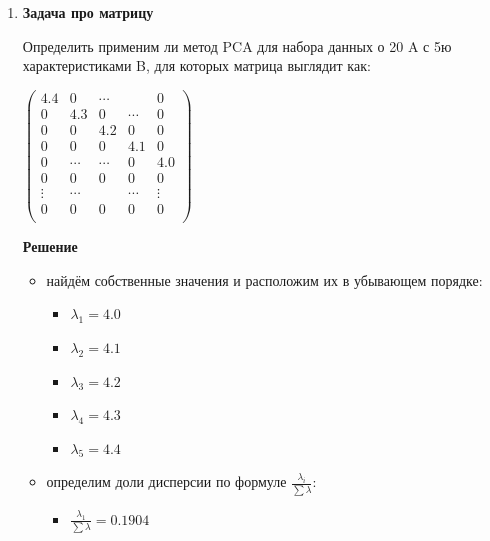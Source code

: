 \begin{enumerate}
    \item \textbf{Задача про матрицу} \par
          Определить применим ли метод PCA для набора данных о 20 A  с 5ю характеристиками B, для которых матрица выглядит как:\par
          $\begin{pmatrix}
                  4.4    & 0      & \cdots &        & 0      \\
                  0      & 4.3    & 0      & \cdots & 0      \\
                  0      & 0      & 4.2    & 0      & 0      \\
                  0      & 0      & 0      & 4.1    & 0      \\
                  0      & \cdots & \cdots & 0      & 4.0    \\
                  0      & 0      & 0      & 0      & 0      \\
                  \vdots & \cdots &        & \cdots & \vdots \\
                  0      & 0      & 0      & 0      & 0      \\
              \end{pmatrix}$ \par
          \textbf{Решение} \par
          \begin{itemize}
              \item найдём собственные значения и расположим их в убывающем порядке:\par
                    \begin{itemize}
                        \item $\lambda_{1}  = 4.0$
                        \item $\lambda_{2}  = 4.1$
                        \item $\lambda_{3}  = 4.2$
                        \item $\lambda_{4}  = 4.3$
                        \item $\lambda_{5}  = 4.4$
                    \end{itemize}
              \item определим доли дисперсии по формуле $\frac{ \lambda_i }{\sum \lambda}$: \par
                    \begin{itemize}
                        \item $\frac{ \lambda_1 }{\sum \lambda}  = 0.1904$

\end{itemize}
\end{itemize}
\end{enumerate}
